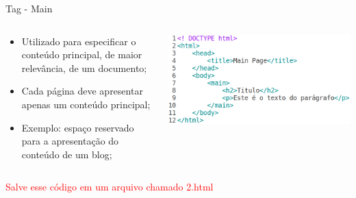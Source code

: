 \documentclass{beamer}
\begin{document}
\begin{frame}{Tag - Main}
  \begin{columns}
    \begin{column}{0.4 \textwidth}
      \footnotesize
      \begin{itemize}
	\item Utilizado para especificar o conteúdo principal, de maior
relevância, de um documento;
	 \item Cada página deve apresentar apenas um conteúdo principal;
	 \item Exemplo: espaço reservado para a apresentação do conteúdo 
de um blog;
      \end{itemize}
    \end{column}
    \begin{column}{0.6\textwidth}
     \includegraphics[height=0.35\paperheight]{fig/aula1/html19.png}
    \end{column}
  \end{columns}
  \textcolor{red}{Salve esse código em um arquivo chamado 2.html}
\end{frame}
\end{document}
